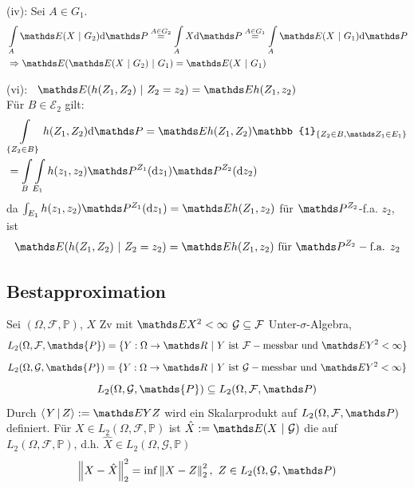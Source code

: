 (iv): Sei $A\in G_1$.
\begin{equation*}
\begin{aligned}
	&\int\limits_A \E(X~|~G_2)\dint\Pw \stackrel{A\in G_2}{=} \int\limits_A X\dint\Pw \stackrel{A\in G_1}{=} \int\limits_A \E(X~|~G_1)\dint\Pw\\
	&\Rightarrow \E(\E(X~|~G_2)~|~G_1)=\E(X~|~G_1)
\end{aligned}
\end{equation*}

(vi): \zz~$\E(h(Z_1,Z_2)~|~ Z_2=z_2)=\E h(Z_1,z_2)$\\
Für $B\in \mathcal{E}_2$ gilt:
\begin{equation*}
\begin{aligned}
	&\int\limits_{\{Z_2\in B\}} h(Z_1,Z_2)\dint\Pw = \E h(Z_1,Z_2)\mathbb{1}_{\{Z_2\in B,\Z_1\in E_1 \}}\\
	&=\int\limits_B\int\limits_{E_1}h(z_1,z_2)\Pw^{Z_1}(\dint z_1)\Pw^{Z_2}(\dint z_2)
\end{aligned}
\end{equation*}
da $\int_{E_1}h(z_1,z_2)\Pw^{Z_1}(\dint z_1)= \E h(Z_1,z_2)$ für $\Pw^{Z_2}$-f.a. $z_2$, ist 
\[
\E(h(Z_1,Z_2)~|~ Z_2=z_2)=\E h(Z_1,z_2) \text{ für }\Pw^{Z_2}-\text{f.a. } z_2 
\]

\subsection{Bestapproximation}
Sei $(\Omega,\mathcal{F},\mathds{P})$, $X$ Zv mit $\E X^2<\infty$ $\mathcal{G}\subseteq \mathcal{F}$ Unter-$\sigma$-Algebra,
\[
L_2(\Omega,\mathcal{F},\mathds{P})= \{Y:\Omega\to \R~|~Y \text{ ist }\mathcal{F}-\text{messbar und }\E Y^2<\infty \} 
\]
\[
L_2(\Omega,\mathcal{G},\mathds{P})= \{Y:\Omega\to \R~|~Y \text{ ist }\G-\text{messbar und }\E Y^2<\infty \} 
\]
\[
L_2(\Omega,\mathcal{G},\mathds{P})\subseteq L_2(\Omega,\mathcal{F},\Pw)
\]
Durch $\sprod{Y}{Z}:=\E YZ $ wird ein Skalarprodukt auf $L_2(\Omega,\mathcal{F},\Pw)$ definiert.
Für $X\in L_2(\Omega,\mathcal{F},\mathds{P})$ ist $\hat{X}:= \E(X~|~\mathcal{G})$ die  auf $L_2(\Omega,\mathcal{F},\mathds{P})$, d.h. $\hat{X}\in L_2(\Omega,\mathcal{G},\mathds{P})$
\[
\norm{X-\hat{X}}_2^2=\inf\norm{X-Z}_2^2,~Z\in L_2(\Omega,\G,\Pw) 
\]

